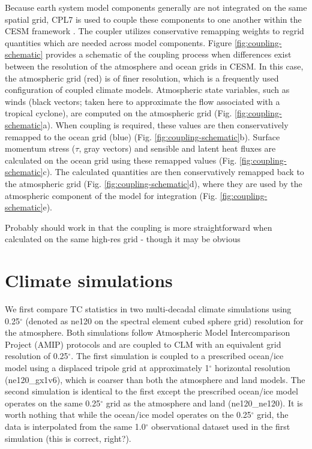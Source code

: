 \documentclass[draft,ms]{AGUTeX}
\newcommand{\degree}{$^{\circ}$}
\begin{document}
\begin{article}
Because earth system model components generally are not integrated on the same spatial grid, CPL7 is used to couple these components to one another within the CESM framework \citep{Craig2012}. The coupler utilizes conservative remapping weights to regrid quantities which are needed across model components. Figure \ref{fig:coupling-schematic} provides a schematic of the coupling process when differences exist between the resolution of the atmosphere and ocean grids in CESM. In this case, the atmospheric grid (red) is of finer resolution, which is a frequently used configuration of coupled climate models. Atmospheric state variables, such as winds (black vectors; taken here to approximate the flow associated with a tropical cyclone), are computed on the atmospheric grid (Fig. \ref{fig:coupling-schematic}a). When coupling is required, these values are then conservatively remapped to the ocean grid (blue) (Fig. \ref{fig:coupling-schematic}b). Surface momentum stress ($\tau$, gray vectors) and sensible and latent heat fluxes are calculated on the ocean grid using these remapped values (Fig. \ref{fig:coupling-schematic}c). The calculated quantities are then conservatively remapped back to the atmospheric grid (Fig. \ref{fig:coupling-schematic}d), where they are used by the atmospheric component of the model for integration (Fig. \ref{fig:coupling-schematic}e).

{\color{red}Probably should work in that the coupling is more straightforward when calculated on the same high-res grid - though it may be obvious} 

\section{Climate simulations}
\label{sec:climate}

We first compare TC statistics in two multi-decadal climate simulations using 0.25\degree{} (denoted as ne120 on the spectral element cubed sphere grid) resolution for the atmosphere. Both simulations follow Atmospheric Model Intercomparison Project (AMIP) protocols \citep{Gates1992} and are coupled to CLM with an equivalent grid resolution of 0.25\degree{}. The first simulation is coupled to a prescribed ocean/ice model using a displaced tripole grid at approximately 1\degree{} horizontal resolution (ne120\_gx1v6), which is coarser than both the atmosphere and land models. The second simulation is identical to the first except the prescribed ocean/ice model operates on the same 0.25\degree{} grid as the atmosphere and land (ne120\_ne120). It is worth nothing that while the ocean/ice model operates on the 0.25\degree{} grid, the data is interpolated from the same 1.0\degree{} observational dataset used in the first simulation {\color{red}(this is correct, right?)}.


\end{article}
\end{document}
